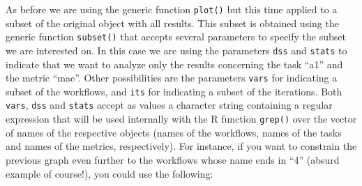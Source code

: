 \documentclass[10pt,a4paper]{article}\usepackage[]{graphicx}\usepackage[]{color}
\begin{document}
As before we are using the generic function \texttt{plot()} but this
time applied to a subset of the original object with all results. This
subset is obtained using the generic function \texttt{subset()} that
accepts several parameters to specify the subset we are interested
on. In this case we are using the parameters \texttt{dss} and
\texttt{stats} to indicate that we want to analyze only the results
concerning the task ``a1'' and the metric ``mae''. Other possibilities
are the parameters \texttt{vars} for indicating a subset of the
workflows, and \texttt{its} for indicating a subset of the
iterations. Both \texttt{vars}, \texttt{dss} and \texttt{stats} accept
as values a character string containing a regular expression that will
be used internally with the R function \texttt{grep()} over the vector
of names of the respective objects (names of the workflows, names of
the tasks and names of the metrics, respectively). For instance, if
you want to constrain the previous graph even further to the workflows
whose name ends in ``4'' (absurd example of course!), you could use
the following:
\end{document}
